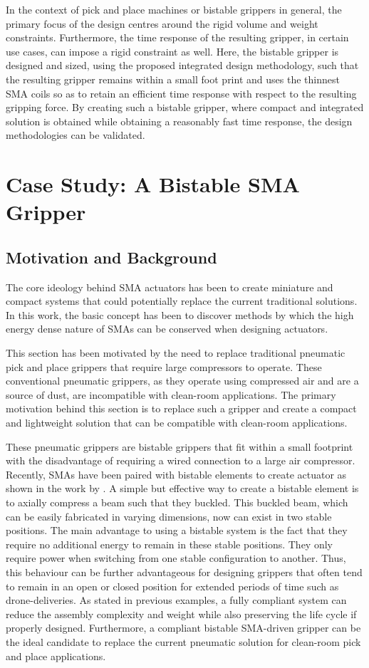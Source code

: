 In the context of pick and place machines or bistable grippers in general, the primary focus of the design centres around the rigid volume and weight constraints. Furthermore, the time response of the resulting gripper, in certain use cases, can impose a rigid constraint as well. Here, the bistable gripper is designed and sized, using the proposed integrated design methodology, such that the resulting gripper remains within a small foot print and uses the thinnest SMA coils so as to retain an efficient time response with respect to the resulting gripping force. By creating such a bistable gripper, where compact and integrated solution is obtained while obtaining a reasonably fast time response, the design methodologies can be validated.

\section{Case Study: A Bistable SMA Gripper}\label{sec:smabb-gripper}
\subsection{Motivation and Background}
The core ideology behind SMA actuators has been to create miniature and compact systems that could potentially replace the current traditional solutions. In this work, the basic concept has been to discover methods by which the high energy dense nature of SMAs can be conserved when designing actuators.

This section has been motivated by the need to replace traditional pneumatic pick and place grippers that require large compressors to operate. These conventional pneumatic grippers, as they operate using compressed air and are a source of dust, are incompatible with clean-room applications. The primary motivation behind this section is to replace such a gripper and create a compact and lightweight solution that can be compatible with clean-room applications.

These pneumatic grippers are bistable grippers that fit within a small footprint with the disadvantage of requiring a wired connection to a large air compressor. Recently, SMAs have been paired with bistable elements to create actuator as shown in the work by \todocite. A simple but effective way to create a bistable element is to axially compress a beam such that they buckled. This buckled beam, which can be easily fabricated in varying dimensions, now can exist in two stable positions. The main advantage to using a bistable system is the fact that they require no additional energy to remain in these stable positions. They only require power when switching from one stable configuration to another. Thus, this behaviour can be further advantageous for designing grippers that often tend to remain in an open or closed position for extended periods of time such as drone-deliveries. As stated in previous examples, a fully compliant system can reduce the assembly complexity and weight while also preserving the life cycle if properly designed. Furthermore, a compliant bistable SMA-driven gripper can be the ideal candidate to replace the current pneumatic solution for clean-room pick and place applications.
